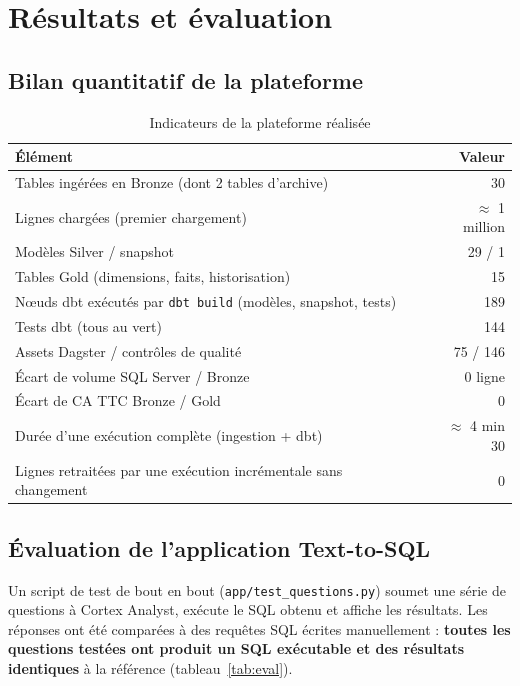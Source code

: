 \chapter{Résultats et évaluation}
\label{ch:resultats}

\section{Bilan quantitatif de la plateforme}

\begin{table}[H]
\centering
\caption{Indicateurs de la plateforme réalisée}
\label{tab:bilan}
\begin{tabularx}{\linewidth}{@{}X r@{}}
\toprule
\textbf{Élément} & \textbf{Valeur} \\
\midrule
Tables ingérées en Bronze (dont 2 tables d'archive) & 30 \\
Lignes chargées (premier chargement) & $\approx$ 1 million \\
Modèles Silver / snapshot & 29 / 1 \\
Tables Gold (dimensions, faits, historisation) & 15 \\
Nœuds dbt exécutés par \texttt{dbt build} (modèles, snapshot, tests) & 189 \\
Tests dbt (tous au vert) & 144 \\
Assets Dagster / contrôles de qualité & 75 / 146 \\
Écart de volume SQL Server / Bronze & 0 ligne \\
Écart de CA TTC Bronze / Gold & 0 \\
Durée d'une exécution complète (ingestion + dbt) & $\approx$ 4 min 30 \\
Lignes retraitées par une exécution incrémentale sans changement & 0 \\
\bottomrule
\end{tabularx}
\end{table}

\section{Évaluation de l'application Text-to-SQL}

Un script de test de bout en bout (\texttt{app/test\_questions.py}) soumet une série de questions à
Cortex Analyst, exécute le SQL obtenu et affiche les résultats. Les réponses ont été comparées à des
requêtes SQL écrites manuellement : \textbf{toutes les questions testées ont produit un SQL exécutable
et des résultats identiques} à la référence (tableau~\ref{tab:eval}).

